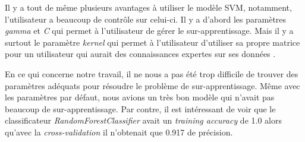 \documentclass[12pt]{extarticle}
\let\cite\parencite
\begin{document}
Il y a tout de même plusieurs avantages à utiliser le modèle SVM, notamment, l'utilisateur a beaucoup de contrôle sur celui-ci. Il y a d'abord les paramètres \emph{gamma} et \emph{C} qui permet à l'utilisateur de gérer le sur-apprentissage. Mais il y a surtout le paramètre \emph{kernel} qui permet à l'utilisateur d'utiliser sa propre matrice pour un utilisateur qui aurait des connaissances expertes sur ses données \cite{sklearn}.

En ce qui concerne notre travail, il ne nous a pas été trop difficile de trouver des paramètres adéquats pour résoudre le problème de sur-apprentissage. Même avec les paramètres par défaut, nous avions un très bon modèle qui n'avait pas beaucoup de sur-apprentissage. Par contre, il est intéressant de voir que le classificateur \emph{RandomForestClassifier} avait un \emph{training accuracy} de 1.0 alors qu'avec la \emph{cross-validation} il n'obtenait que 0.917 de précision.

\newpage
{}
{}
\printbibliography
\end{document}
